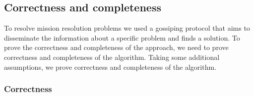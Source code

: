 \documentclass[journal]{IEEEtran}
\theoremstyle{definition}
\newcommand\patrizio[1]{\nb{Patrizio}{#1}}
\begin{document}



\subsection{Correctness and completeness}
To resolve mission resolution problems we used a gossiping protocol that aims to disseminate the information about a specific problem and finds a solution. To prove the correctness and completeness of the approach, we need to prove correctness and completeness of the algorithm. 
Taking some additional assumptions, we prove correctness and completeness of the algorithm.
\subsubsection{Correctness} 
\end{document}

